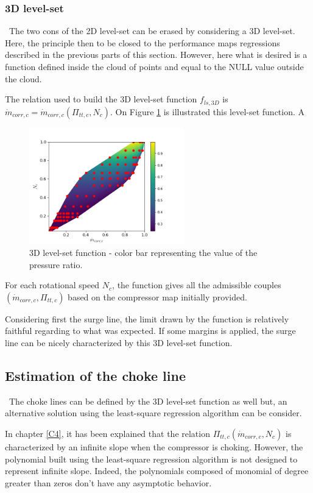 \subsubsection{3D level-set}
\quad\ The two cons of the 2D level-set can be erased by considering a 3D level-set. Here, the principle then to be closed to the performance maps regressions described in the previous parts of this section. However, here what is desired is a function defined inside the cloud of points and equal to the NULL value outside the cloud. 

The relation used to build the 3D level-set function $f_{ls,3D}$ is $\dot{m}_{corr,c} = \dot{m}_{corr,c}(\Pi_{tt,c},N_c)$. On Figure \ref{fig:C7_LS3D} is illustrated this level-set function. A 

\begin{figure}[h]
    \centering
    \includegraphics[width=0.6\textwidth]{Comp_map/3D_LS.png}
    \caption{3D level-set function - color bar representing the value of the pressure ratio.}
    \label{fig:C7_LS3D}
\end{figure}
For each rotational speed $N_c$, the function gives all the admissible couples $(\dot{m}_{corr,c},\Pi_{tt,c})$ based on the compressor map initially provided. 

Considering first the surge line, the limit drawn by the function is relatively faithful regarding to what was expected. If some margins is applied, the surge line can be nicely characterized by this 3D level-set function. 

\subsection{Estimation of the choke line}
\quad\ The choke lines can be defined by the 3D level-set function as well but, an alternative solution using the least-square regression algorithm can be consider.


In chapter \ref{C4}, it has been explained that the relation $\Pi_{tt,c}(\dot{m}_{corr,c},N_c)$ is characterized by an infinite slope when the compressor is choking. However, the polynomial built using the least-square regression algorithm is not designed to represent infinite slope. Indeed, the polynomials composed of monomial of degree greater than zeros don't have any asymptotic behavior.

